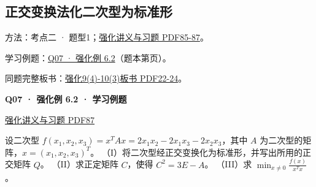 \documentclass[UTF8,fontset=fandol,11pt,a4paper]{ctexart}
\newcommand{\source}[1]{{\footnotesize\color{Muted}#1\par}}
\newcommand{\qtitle}[2]{\par\needspace{5\baselineskip}\hypertarget{#1}{}\label{#1}\textbf{#2}\par}
\begin{document}
\subsection*{正交变换法化二次型为标准形}
\hypertarget{node-A1}{}
方法：考点二 · 题型1；\href{file:///Users/skyintelligence/Desktop/\%E5\%BE\%97\%E8\%AF\%BB\%E4\%B8\%AA\%E7\%A0\%94-\%E5\%8C\%97\%E5\%A4\%A7\%E8\%BD\%AF\%E5\%BE\%AE/\%E6\%95\%B0\%E5\%AD\%A6\%20150/Kira\%C2\%B727\%E7\%BA\%BF\%E6\%80\%A7\%E4\%BB\%A3\%E6\%95\%B0\%E5\%BC\%BA\%E5\%8C\%96\%E8\%AE\%B2\%E4\%B9\%89\%2B\%E4\%B9\%A0\%E9\%A2\%98.pdf\#page=85}{强化讲义与习题 PDF85-87}。\par
学习例题：\hyperlink{R-EX-02}{Q07 · 强化例 6.2}（题本第\pageref*{R-EX-02}页）。\par
同题完整板书：\href{file:///Users/skyintelligence/Desktop/\%E5\%BE\%97\%E8\%AF\%BB\%E4\%B8\%AA\%E7\%A0\%94-\%E5\%8C\%97\%E5\%A4\%A7\%E8\%BD\%AF\%E5\%BE\%AE/\%E6\%95\%B0\%E5\%AD\%A6\%20150/\%E7\%BA\%BF\%E6\%80\%A7\%E4\%BB\%A3\%E6\%95\%B0/\%E7\%BA\%BF\%E4\%BB\%A3\%E5\%BC\%BA\%E5\%8C\%969\%284\%29-10\%283\%29\%20\%20\%E7\%AC\%AC\%E4\%BA\%94\%E5\%85\%AD\%E7\%AB\%A0\%20\%E5\%AE\%9E\%E5\%AF\%B9\%E7\%A7\%B0\%E7\%9F\%A9\%E9\%98\%B5\%26\%E4\%BA\%8C\%E6\%AC\%A1\%E5\%9E\%8B1\%E3\%80\%90\%E4\%BE\%8B5.6\%E3\%80\%91-\%E3\%80\%90\%E4\%BE\%8B6.4\%E3\%80\%91.pdf\#page=22}{强化9(4)-10(3)板书 PDF22-24}。\par
\vspace{3mm}
\begin{minipage}{\linewidth}
\qtitle{R-EX-02}{Q07 · 强化例 6.2 · 学习例题}
\source{\href{file:///Users/skyintelligence/Desktop/\%E5\%BE\%97\%E8\%AF\%BB\%E4\%B8\%AA\%E7\%A0\%94-\%E5\%8C\%97\%E5\%A4\%A7\%E8\%BD\%AF\%E5\%BE\%AE/\%E6\%95\%B0\%E5\%AD\%A6\%20150/Kira\%C2\%B727\%E7\%BA\%BF\%E6\%80\%A7\%E4\%BB\%A3\%E6\%95\%B0\%E5\%BC\%BA\%E5\%8C\%96\%E8\%AE\%B2\%E4\%B9\%89\%2B\%E4\%B9\%A0\%E9\%A2\%98.pdf\#page=87}{强化讲义与习题 PDF87}}
设二次型 $f(x_1,x_2,x_3)=x^TAx=2x_1x_2-2x_1x_3-2x_2x_3$，其中 $A$ 为二次型的矩阵，$x=(x_1,x_2,x_3)^T$。
（I）将二次型经正交变换化为标准形，并写出所用的正交矩阵 $Q$。
（II）求正定矩阵 $C$，使得 $C^2=3E-A$。
（III）求 $\displaystyle\min_{x\ne0}\frac{f(x)}{x^Tx}$。
\end{minipage}\par\vspace{7mm}
\end{document}
